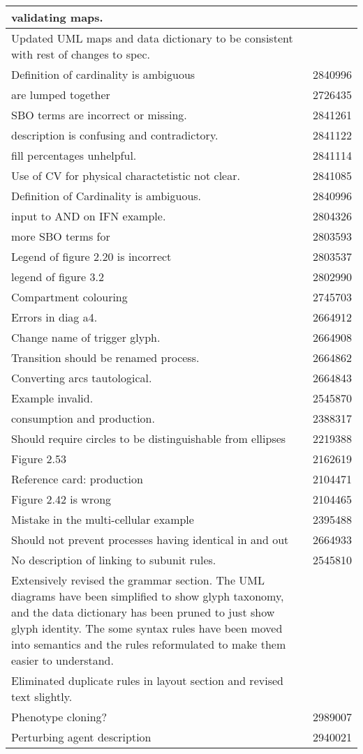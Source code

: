 \begin{center}
\begin{supertabular}{|p{12cm}|c|}
validating maps. & \\\hline
Updated UML maps and data dictionary  to be consistent with rest
of changes to spec. & \\\hline
Definition of cardinality is ambiguous & 2840996 \\\hline
{} are lumped together & 2726435 \\\hline
SBO terms are incorrect or missing. & 2841261 \\\hline
{} description is confusing and contradictory. & 2841122
\\\hline
{} fill percentages unhelpful. & 2841114 \\\hline
Use of CV for physical charactetistic not clear. & 2841085 \\\hline
Definition of Cardinality is ambiguous. & 2840996 \\\hline
input to AND on IFN example. & 2804326 \\\hline
more SBO terms for  & 2803593 \\\hline
Legend of figure 2.20 is incorrect & 2803537 \\\hline
legend of figure 3.2 & 2802990 \\\hline
Compartment colouring & 2745703 \\\hline
Errors in diag a4. & 2664912 \\\hline
Change name of trigger glyph. & 2664908 \\\hline
Transition should be renamed process. & 2664862 \\\hline
Converting arcs tautological. & 2664843 \\\hline
Example invalid. & 2545870 \\\hline
consumption and production. & 2388317 \\\hline
Should require circles to be distinguishable from ellipses & 2219388
\\\hline
Figure 2.53 & 2162619 \\\hline
Reference card: production & 2104471 \\\hline
Figure 2.42 is wrong & 2104465 \\\hline
Mistake in the multi-cellular example  & 2395488 \\\hline
Should not prevent processes having identical in and out & 2664933
\\\hline
No description of linking to subunit rules. & 2545810 \\\hline
Extensively revised the grammar section. The UML diagrams have been simplified to show glyph taxonomy, and the data dictionary has been pruned to just show glyph identity. The some syntax rules have been moved into semantics and the rules reformulated to make them easier to understand. & \\\hline
Eliminated duplicate rules in layout section and revised text
slightly. & \\\hline
Phenotype cloning? & 2989007 \\\hline
Perturbing agent description & 2940021 \\\hline
\end{supertabular}
\end{center}

